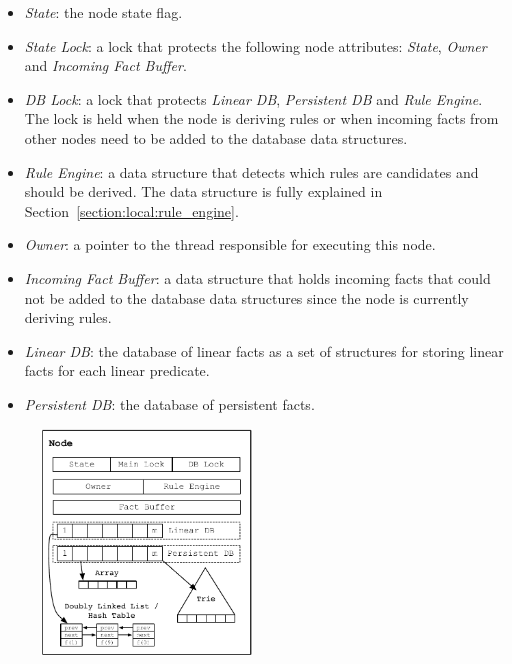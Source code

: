 \begin{itemize}
   \item \emph{State}: the node state flag.
   \item \emph{State Lock}: a lock that protects the following node attributes:
      \emph{State}, \emph{Owner} and \emph{Incoming Fact Buffer}.
   \item \emph{DB Lock}: a lock that protects \emph{Linear DB},
      \emph{Persistent DB} and \emph{Rule Engine}. The lock is held when the node is deriving rules or
      when incoming facts from other nodes need to be added to the database data
      structures.
   \item \emph{Rule Engine}: a data structure that detects which rules are
      candidates and should be derived. The data structure is fully explained
      in Section~\ref{section:local:rule_engine}.
   \item \emph{Owner}: a pointer to the thread responsible for executing this
      node.
   \item \emph{Incoming Fact Buffer}: a data structure that holds incoming facts that
      could not be added to the database data structures since the node is
      currently deriving rules.
   \item \emph{Linear DB}: the database of linear facts as a set of
      structures for storing linear facts for each linear predicate.
   \item \emph{Persistent DB}: the database of persistent facts.
\end{itemize}

\begin{figure}[t]
\centering
\includegraphics[width=0.5\textwidth]{figures/local/node.pdf}
\label{fig:local:node_overview}
\end{figure}

